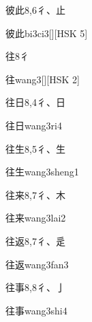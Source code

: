 \begin{entry}{彼此}{8,6}{⼻、⽌}
  \begin{phonetics}{彼此}{bi3ci3}[][HSK 5]
  \end{phonetics}
\end{entry}

\begin{entry}{往}{8}{⼻}
  \begin{phonetics}{往}{wang3}[][HSK 2]
  \end{phonetics}
\end{entry}

\begin{entry}{往日}{8,4}{⼻、⽇}
  \begin{phonetics}{往日}{wang3ri4}
  \end{phonetics}
\end{entry}

\begin{entry}{往生}{8,5}{⼻、⽣}
  \begin{phonetics}{往生}{wang3sheng1}
  \end{phonetics}
\end{entry}

\begin{entry}{往来}{8,7}{⼻、⽊}
  \begin{phonetics}{往来}{wang3lai2}
  \end{phonetics}
\end{entry}

\begin{entry}{往返}{8,7}{⼻、⾡}
  \begin{phonetics}{往返}{wang3fan3}
  \end{phonetics}
\end{entry}

\begin{entry}{往事}{8,8}{⼻、⼅}
  \begin{phonetics}{往事}{wang3shi4}
  \end{phonetics}
\end{entry}

